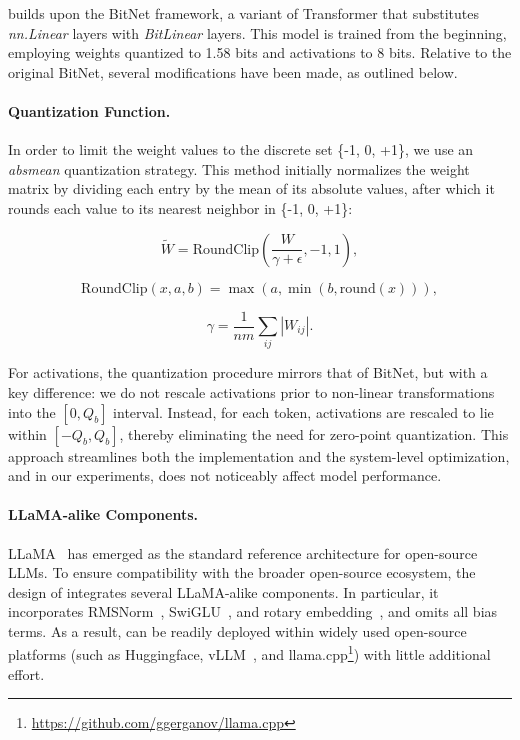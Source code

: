  builds upon the BitNet framework, a variant of Transformer that substitutes \emph{nn.Linear} layers with \emph{BitLinear} layers. This model is trained from the beginning, employing weights quantized to 1.58 bits and activations to 8 bits. Relative to the original BitNet, several modifications have been made, as outlined below.

\paragraph{Quantization Function.} In order to limit the weight values to the discrete set \{-1, 0, +1\}, we use an \emph{absmean} quantization strategy. This method initially normalizes the weight matrix by dividing each entry by the mean of its absolute values, after which it rounds each value to its nearest neighbor in \{-1, 0, +1\}:

\begin{equation}
    \widetilde{W} = \mathrm{RoundClip}(\frac{W}{\gamma + \epsilon}, -1, 1),
\end{equation}

\begin{equation}
    \mathrm{RoundClip}(x, a, b) = \max(a, \min(b, \mathrm{round}(x))),
\end{equation}

\begin{equation}
    \gamma = \frac{1}{nm}\sum_{ij} |W_{ij}|.
\end{equation}

For activations, the quantization procedure mirrors that of BitNet, but with a key difference: we do not rescale activations prior to non-linear transformations into the $[0, Q_b]$ interval. Instead, for each token, activations are rescaled to lie within $[-Q_b, Q_b]$, thereby eliminating the need for zero-point quantization. This approach streamlines both the implementation and the system-level optimization, and in our experiments, does not noticeably affect model performance.

\paragraph{LLaMA-alike Components.}

LLaMA~\cite{llama, llama2} has emerged as the standard reference architecture for open-source LLMs. To ensure compatibility with the broader open-source ecosystem, the design of  integrates several LLaMA-alike components. In particular, it incorporates RMSNorm~\cite{rmsnorm}, SwiGLU~\cite{swiglu}, and rotary embedding~\cite{rope}, and omits all bias terms. As a result,  can be readily deployed within widely used open-source platforms (such as Huggingface, vLLM~\cite{vllm}, and llama.cpp\footnote{\url{https://github.com/ggerganov/llama.cpp}}) with little additional effort.


